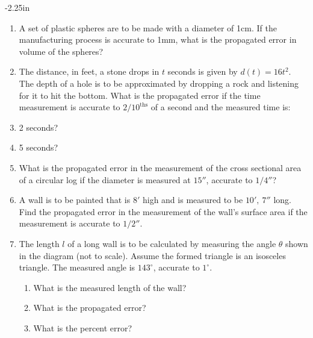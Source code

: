 \begin{adjustwidth*}{}{-2.25in}
\setlength{\columnsep}{25pt}
\begin{multicols*}{2}\small

\begin{enumerate}[1),start=26]
\item A set of plastic spheres are to be made with a diameter of 1cm. If the manufacturing process is accurate to 1mm, what is the propagated error in volume of the spheres?

\item The distance, in feet, a stone drops in $t$ seconds is given by $d(t) = 16t^2$. The depth of a hole is to be approximated by dropping a rock and listening for it to hit the bottom. What is the propagated error if the time measurement is accurate to $2/10^{\text{ths}}$ of a second and the measured time is:
	\ba
	\item 2 seconds?
	\item	5 seconds?
	\ea

\item What is the propagated error in the measurement of the cross sectional area of a circular log if the diameter is measured at $15''$, accurate to $1/4''$?

\item A wall is to be painted that is $8'$ high and is measured to be $10',\ 7''$ long. Find the propagated error in the measurement of the wall's surface area if the measurement is accurate to $1/2''$. 

\item \label{exer:04_04_ex_34}The length $l$ of a long wall is to be calculated by measuring the angle $\theta$ shown in the diagram (not to scale). Assume the formed triangle is an isosceles triangle. The measured angle is $143^\circ$, accurate to $1^\circ$. 

\begin{minipage}{\linewidth}
\centering
{}
\end{minipage}

\begin{enumerate}
\item		What is the measured length of the wall?
\item		What is the propagated error? 
\item		What is the percent error?
\end{enumerate}


\end{enumerate}
\end{multicols*}
\end{adjustwidth*}
